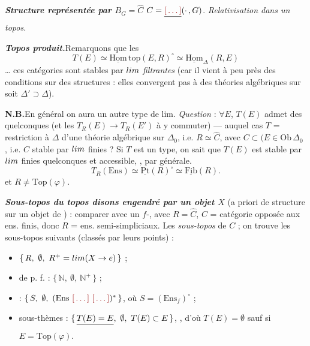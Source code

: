 \documentclass[11pt,a4paper]{article}
\begin{document}

\textbf{\emph{Structure représentée par} $B_{G} = \hat{C}$}\quad
$C = \struck{\ill{}}(\cdot\,, G)$. \emph{Relativisation dans un topos.}

\textbf{\emph{Topos produit.}}\quad Remarquons que les
\[
  T(E) \simeq \underline{\mathrm{Hom}}\,\mathrm{top}(E, R)^{\circ}
        \simeq \underline{\mathrm{Hom}}_{\Delta}(R, E)
\]
… ces catégories sont stables par $\varinjlim$ \emph{filtrantes}
(car il vient à peu près des conditions sur des structures : elles \ill{}
convergent \ill{} pas à des théories algébriques sur \struck{\ill{}}
 soit $\Delta' \supset \Delta$).

\textbf{N.B.}\quad En général on aura un autre type de lim.
\emph{Question} : $\forall E$, $T(E)$ admet des 
 quelconques (et les $T_{R}(E) \to T_{R}(E')$ à y
commuter) — auquel cas $T$ = restriction à $\Delta$ d'une théorie algébrique
sur $\Delta_{0}$, i.e. $R \simeq \hat{C}$, avec $C \subset (E \in
\mathrm{Ob}\,\Delta_{0}$ , i.e. $C$ stable par $\varprojlim$
finies ? Si $T$ est un type, on sait que $T(E)$ est stable par $\varprojlim$
finies quelconques et accessible, \struck{\ill{}},  par \ill{}
générale.
\[
  T_{R}(\mathrm{Ens}) \simeq \underline{\mathrm{Pt}}(R)^{\circ}
    \simeq \underline{\mathrm{Fib}}(R) .
\]
 \ill{} et
$R \neq \mathrm{Top}(\varphi)$.

\textbf{\emph{Sous-topos du topos disons  engendré par un objet
$X$}} (a priori de structure \ill{} sur un objet de \ill{}) : comparer avec un
$f$-\ill{}, avec $R = \hat{C}$, $C$ = catégorie opposée  aux ens. finis, donc $R$ = ens. semi-simpliciaux. Les
\emph{sous-topos}  \ill{} de $C$ ; on trouve les
sous-topos suivants (classés \ill{} par leurs points) :

\begin{itemize}
  \item $\{\, R,\ \emptyset,\ R^{+} = \varprojlim (X \to e) \,\}$ ;
  \item de p. f. : $\{\, \mathbb{N},\ \emptyset,\ \mathbb{N}^{+} \,\}$ ;
  \item {} : $\{\, S,\ \emptyset,\ (\mathrm{Ens}\ \ill{}
    \ \ill{})^{*} \,\}$, où $S = (\mathrm{Ens}_{f})^{\circ}$ ;
  \item sous-thèmes : $\{\, \struck{T(E) = E},\ \emptyset,\ T(E) \subset E \,\}$,
    , d'où
    $T(E) = \emptyset$ sauf si $E = \mathrm{Top}(\varphi)$.
\end{itemize}
\end{document}

